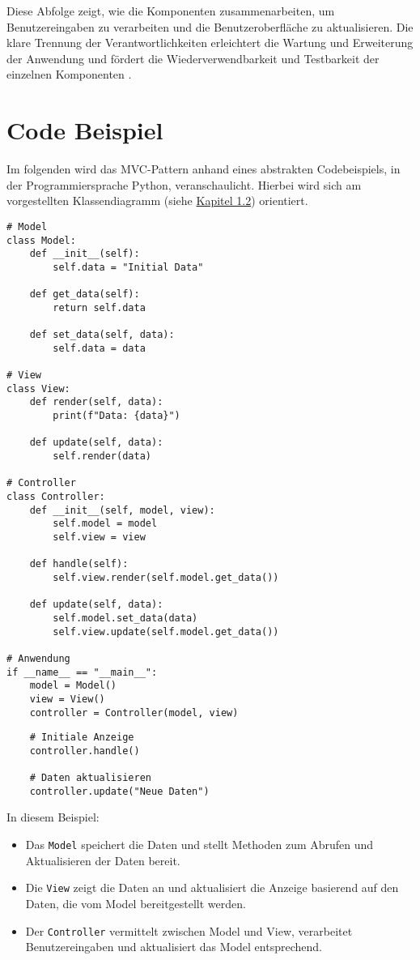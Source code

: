 Diese Abfolge zeigt, wie die Komponenten zusammenarbeiten, um Benutzereingaben zu verarbeiten und die Benutzeroberfläche zu aktualisieren. Die klare Trennung der Verantwortlichkeiten erleichtert die Wartung und Erweiterung der Anwendung und fördert die Wiederverwendbarkeit und Testbarkeit der einzelnen Komponenten \cite{delessy2012securemvc}.

\section{Code Beispiel}

Im folgenden wird das \ac{MVC}-Pattern anhand eines abstrakten Codebeispiels, in der Programmiersprache Python, veranschaulicht. Hierbei wird sich am vorgestellten Klassendiagramm (siehe \hyperref[sec:klassendiagramm]{Kapitel 1.2}) orientiert.

\begin{verbatim}
# Model
class Model:
    def __init__(self):
        self.data = "Initial Data"

    def get_data(self):
        return self.data

    def set_data(self, data):
        self.data = data

# View
class View:
    def render(self, data):
        print(f"Data: {data}")

    def update(self, data):
        self.render(data)

# Controller
class Controller:
    def __init__(self, model, view):
        self.model = model
        self.view = view

    def handle(self):
        self.view.render(self.model.get_data())

    def update(self, data):
        self.model.set_data(data)
        self.view.update(self.model.get_data())

# Anwendung
if __name__ == "__main__":
    model = Model()
    view = View()
    controller = Controller(model, view)
\end{verbatim}
\newpage
\begin{verbatim}
    # Initiale Anzeige
    controller.handle()

    # Daten aktualisieren
    controller.update("Neue Daten")
\end{verbatim}

In diesem Beispiel:
\begin{itemize}
    \item Das \texttt{Model} speichert die Daten und stellt Methoden zum Abrufen und Aktualisieren der Daten bereit.
    \item Die \texttt{View} zeigt die Daten an und aktualisiert die Anzeige basierend auf den Daten, die vom Model bereitgestellt werden.
    \item Der \texttt{Controller} vermittelt zwischen Model und View, verarbeitet Benutzereingaben und aktualisiert das Model entsprechend.
\end{itemize}